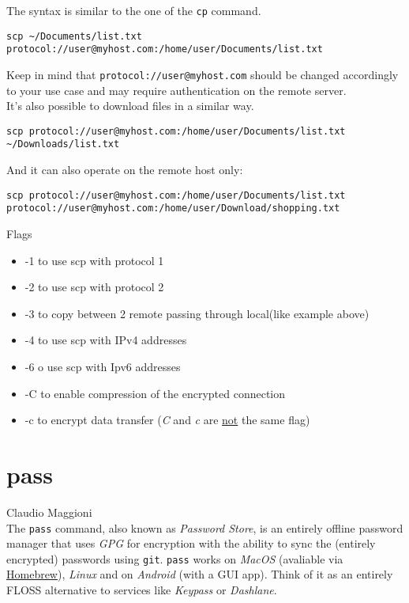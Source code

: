 \documentclass[hidelinks,12pt,a4paper,numbers=enddot]{scrartcl}
\begin{document}
The syntax is similar to the one of the \texttt{cp} command.

\begin{verbatim}
scp ~/Documents/list.txt protocol://user@myhost.com:/home/user/Documents/list.txt
\end{verbatim}

Keep in mind that \texttt{protocol://user@myhost.com} should be changed accordingly to
your use case and may require authentication on the remote server.\\
It's also possible to download files in a similar way.

\begin{verbatim}
scp protocol://user@myhost.com:/home/user/Documents/list.txt ~/Downloads/list.txt
\end{verbatim}

And it can also operate on the remote host only:
\begin{verbatim}
scp protocol://user@myhost.com:/home/user/Documents/list.txt protocol://user@myhost.com:/home/user/Download/shopping.txt
\end{verbatim}


Flags
\begin{itemize}
    \item -1 to use scp with protocol 1 
    \item -2 to use scp with protocol 2 
    \item -3 to copy between 2 remote passing through local(like example above) 
    \item -4 to use scp with IPv4 addresses 
    \item -6 o use scp with Ipv6 addresses 
    \item -C to enable compression of the encrypted connection 
    \item -c to encrypt data transfer (\emph{C} and \emph{c} are \underline{not} the same flag)
\end{itemize}

\section{pass}


\large Claudio Maggioni \normalsize\\




The \texttt{pass} command, also known as \emph{Password Store}, is an
entirely offline password manager that uses \emph{GPG} for encryption with
the ability to sync the (entirely encrypted) passwords using \texttt{git}.
\texttt{pass} works on \emph{MacOS} (avaliable via
\underline{\href{https://brew.sh}{Homebrew}}), \emph{Linux} and on
\emph{Android} (with a GUI app). Think of it as an entirely FLOSS
alternative to services like \emph{Keypass} or \emph{Dashlane}.
\end{document}
